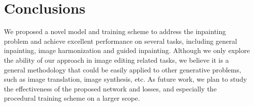 \section{Conclusions}
We proposed a novel model and training scheme to address the inpainting problem and achieve excellent performance on several tasks, including general inpainting, image harmonization and guided inpainting. Although we only explore the ability of our approach in image editing related tasks, we believe it is a general methodology that could be easily applied to other generative problems, such as image translation, image synthesis, etc. As future work, we plan to study the effectiveness of the proposed network and losses, and especially the procedural training scheme on a larger scope.
\label{sec:results}